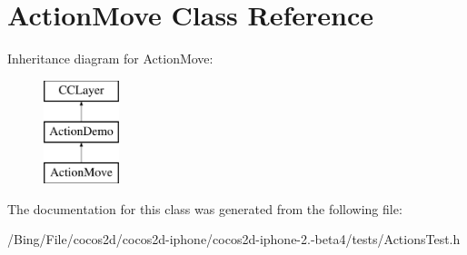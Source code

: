 \hypertarget{interface_action_move}{\section{Action\-Move Class Reference}
\label{interface_action_move}
}
Inheritance diagram for Action\-Move\-:\begin{figure}[H]
\begin{center}
\leavevmode
\includegraphics[height=3.000000cm]{interface_action_move}
\end{center}
\end{figure}


The documentation for this class was generated from the following file\-:\begin{DoxyCompactItemize}
\item 
/\-Bing/\-File/cocos2d/cocos2d-\/iphone/cocos2d-\/iphone-\/2.-\/beta4/tests/Actions\-Test.\-h\end{DoxyCompactItemize}
